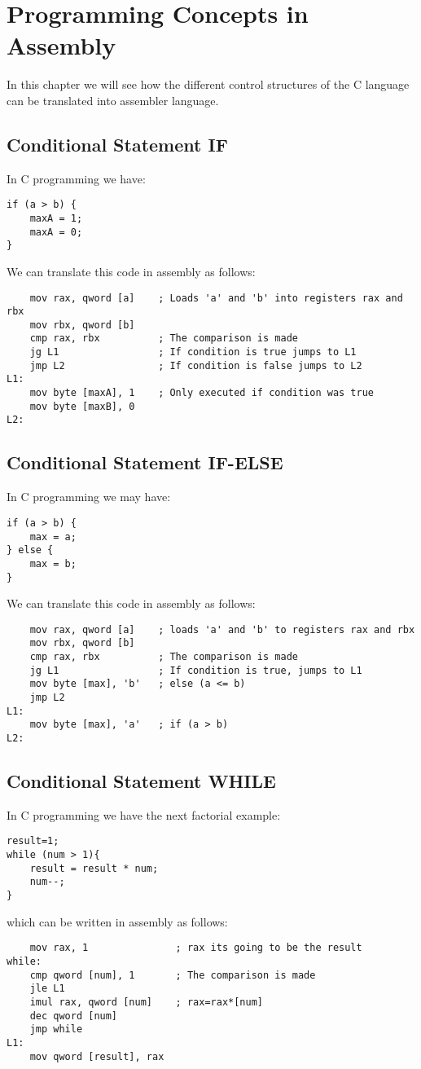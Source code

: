 \chapter{Programming Concepts in Assembly}
In this chapter we will see how the different control structures of the C language can be translated into assembler language.

\section{Conditional Statement IF}
In C programming we have:
\begin{verbatim}
if (a > b) {
	maxA = 1;
	maxA = 0;
}
\end{verbatim}
We can translate this code in assembly as follows:
\begin{verbatim}
	mov rax, qword [a]    ; Loads 'a' and 'b' into registers rax and rbx
	mov rbx, qword [b]
	cmp rax, rbx          ; The comparison is made
	jg L1                 ; If condition is true jumps to L1
	jmp L2                ; If condition is false jumps to L2
L1:
    mov byte [maxA], 1    ; Only executed if condition was true
    mov byte [maxB], 0	
L2:
\end{verbatim}

\section{Conditional Statement IF-ELSE}
In C programming we may have:
\begin{verbatim}
if (a > b) {
	max = a;
} else {
	max = b;
}
\end{verbatim}
We can translate this code in assembly as follows:
\begin{verbatim}
	mov rax, qword [a]    ; loads 'a' and 'b' to registers rax and rbx
	mov rbx, qword [b]
	cmp rax, rbx          ; The comparison is made
	jg L1                 ; If condition is true, jumps to L1
	mov byte [max], 'b'   ; else (a <= b)
	jmp L2
L1:
	mov byte [max], 'a'   ; if (a > b)
L2:
\end{verbatim}

\section{Conditional Statement WHILE}
In C programming we have the next factorial example:
\begin{verbatim}
result=1;
while (num > 1){
    result = result * num;
	num--; 
}
\end{verbatim}
which can be written in assembly as follows:
\begin{verbatim}
	mov rax, 1               ; rax its going to be the result
while:
	cmp qword [num], 1       ; The comparison is made
	jle L1
	imul rax, qword [num]    ; rax=rax*[num]
	dec qword [num]
	jmp while
L1:
	mov qword [result], rax
\end{verbatim}

